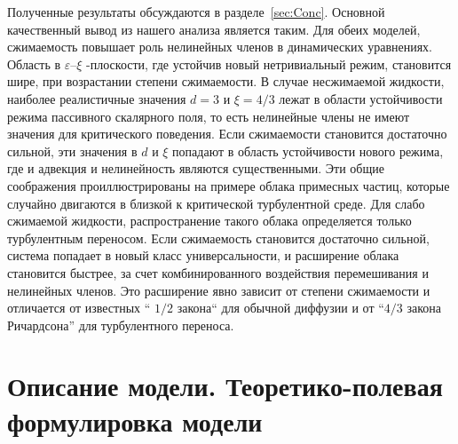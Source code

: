 \documentclass[a4paper,10pt]{article}
\begin{document}
Полученные результаты обсуждаются в разделе~\ref{sec:Conc}.
Основной качественный вывод из нашего анализа является таким. Для обеих моделей, сжимаемость повышает роль нелинейных 
членов в динамических уравнениях. Область в $\varepsilon$--$\xi$ -плоскости, где устойчив новый нетривиальный режим, становится шире, при возрастании степени сжимаемости.
 В случае несжимаемой жидкости, наиболее реалистичные значения $d=3$ и $\xi = 4 / 3 $ 
лежат в области устойчивости режима пассивного скалярного поля, то есть нелинейные члены не имеют значения
 для критического поведения.
Если сжимаемости становится достаточно сильной, эти значения в $d$ и $ \xi $ попадают в область
 устойчивости нового режима, где и адвекция и нелинейность являются существенными.
Эти общие соображения проиллюстрированы на примере облака примесных частиц, которые случайно двигаются 
в близкой к критической турбулентной среде. Для слабо сжимаемой жидкости, распространение такого облака
 определяется только турбулентным переносом. Если сжимаемость становится достаточно сильной, система попадает в новый класс универсальности,
 и расширение облака становится быстрее, за счет комбинированного воздействия перемешивания и нелинейных членов.
Это расширение явно зависит от степени сжимаемости и отличается от известных 
`` $1 / 2$ закона`` для обычной диффузии и от ``$4 / 3$ закона Ричардсона'' для турбулентного переноса.

\section{Описание модели. Теоретико-полевая формулировка модели}
\label{sec:QFT}
\end{document}
